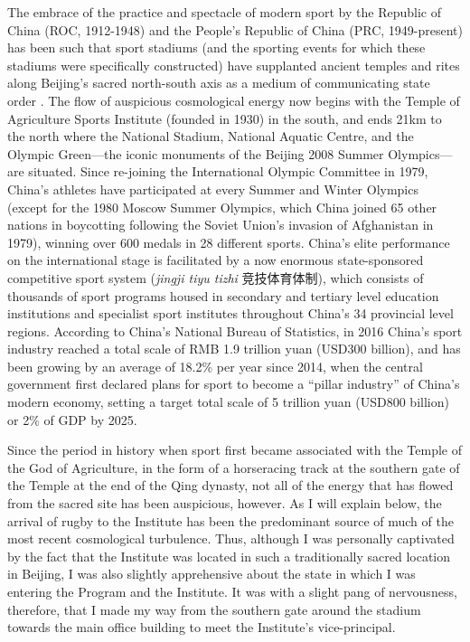 The embrace of the practice and spectacle of modern sport by the Republic of China (ROC, 1912-1948) and the People's Republic of China (PRC, 1949-present) has been such that sport stadiums (and the sporting events for which these stadiums were specifically constructed) have supplanted ancient temples and rites along Beijing's sacred north-south axis as a medium of communicating state order \citep{Brownell1995}.  The flow of auspicious cosmological energy now begins with the Temple of Agriculture Sports Institute (founded in 1930) in the south, and ends 21km to the north where the National Stadium, National Aquatic Centre, and the Olympic Green---the iconic monuments of the Beijing 2008 Summer Olympics---are situated.  Since re-joining the International Olympic Committee in 1979, China's athletes have participated at every Summer and Winter Olympics (except for the 1980 Moscow Summer Olympics, which China joined 65 other nations in boycotting following the Soviet Union's invasion of Afghanistan in 1979), winning over 600 medals in 28 different sports.  China's elite performance on the international stage is facilitated by a now enormous state-sponsored competitive sport system (\textit{jingji tiyu tizhi} 竞技体育体制), which consists of thousands of sport programs housed in secondary and tertiary level education institutions and specialist sport institutes throughout China's 34 provincial level regions.  According to China's National Bureau of Statistics, in 2016 China's sport industry reached a total scale of RMB 1.9 trillion yuan (USD300 billion), and has been growing by an average of 18.2\% per year since 2014, when the central government first declared plans for sport to become a ``pillar industry'' of China's modern economy, setting a target total scale of 5 trillion yuan (USD800 billion) or 2\% of GDP by 2025.

Since the period in history when sport first became associated with the Temple of the God of Agriculture, in the form of a horseracing track at the southern gate of the Temple at the end of the Qing dynasty, not all of the energy that has flowed from the sacred site has been auspicious, however.  As I will explain below, the arrival of rugby to the Institute has been the predominant source of much of the most recent cosmological turbulence.  Thus, although I was personally captivated by the fact that the Institute was located in such a traditionally sacred location in Beijing, I was also slightly apprehensive about the state in which I was entering the Program and the Institute. It was with a slight pang of nervousness, therefore, that I made my way from the southern gate around the stadium towards the main office building to meet the Institute's vice-principal.

